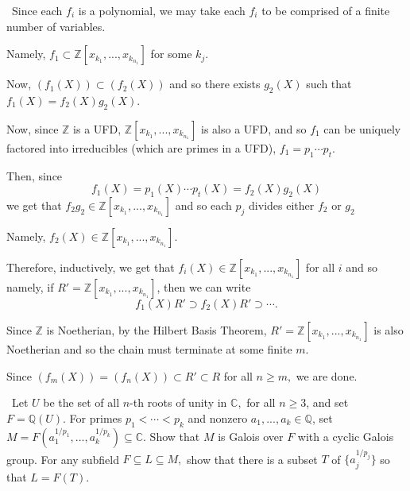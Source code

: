 \documentclass[12pt]{AlgebraQual}
\begin{document}
\begin{solution}$\,$
Since each $f_i$ is a polynomial, we may take each $f_i$ to be comprised of a finite number of variables.

Namely, $f_1\subset\mathbb{Z}[x_{k_1},...,x_{k_{n_1}}]$ for some $k_j$.

Now, $(f_1(X))\subset(f_2(X))$ and so there exists $g_2(X)$ such that $f_1(X)=f_2(X)g_2(X)$. %

Now, since $\mathbb{Z}$ is a UFD, $\mathbb{Z}[x_{k_1},...,x_{k_{n_1}}]$ is also a UFD, and so $f_1$ can be uniquely factored into irreducibles (which are primes in a UFD), $f_1=p_1\cdots p_t$.

Then, since $$f_1(X)=p_1(X)\cdots p_t(X)=f_2(X)g_2(X)$$ we get that $f_2g_2\in\mathbb{Z}[x_{k_1},...,x_{k_{n_1}}]$ and so each $p_j$ divides either $f_2$ or $g_2$

Namely, $f_2(X)\in\mathbb{Z}[x_{k_1},...,x_{k_{n_1}}]$.

Therefore, inductively, we get that $f_i(X)\in\mathbb{Z}[x_{k_1},...,x_{k_{n_1}}]$ for all $i$ and so namely, if $R'=\mathbb{Z}[x_{k_1},...,x_{k_{n_1}}]$, then we can write $$f_1(X)R'\supset f_2(X)R'\supset\cdots.$$

Since $\mathbb{Z}$ is Noetherian, by the Hilbert Basis Theorem, $R'=\mathbb{Z}[x_{k_1},...,x_{k_{n_1}}]$ is also Noetherian and so the chain must terminate at some finite $m.$

Since $(f_m(X))=(f_n(X))\subset R'\subset R$ for all $n\ge m,$ we are done.
\end{solution}
\newpage



\begin{problem} $\,$
Let $U$ be the set of all $n$-th roots of unity in $\mathbb{C},$ for all $n\ge3$, and set $F=\mathbb{Q}(U)$. For primes $p_1<\cdots<p_k$ and nonzero $a_1,...,a_k\in\mathbb{Q}$, set $M=F(a_1^{1/p_1},...,a_k^{1/p_k})\subseteq\mathbb{C}$. Show that $M$ is Galois over $F$ with a cyclic Galois group. For any subfield $F\subseteq L\subseteq M,$ show that there is a subset $T$ of $\{a_j^{1/p_j}\}$ so that $L=F(T).$
\end{problem}
\end{document}
